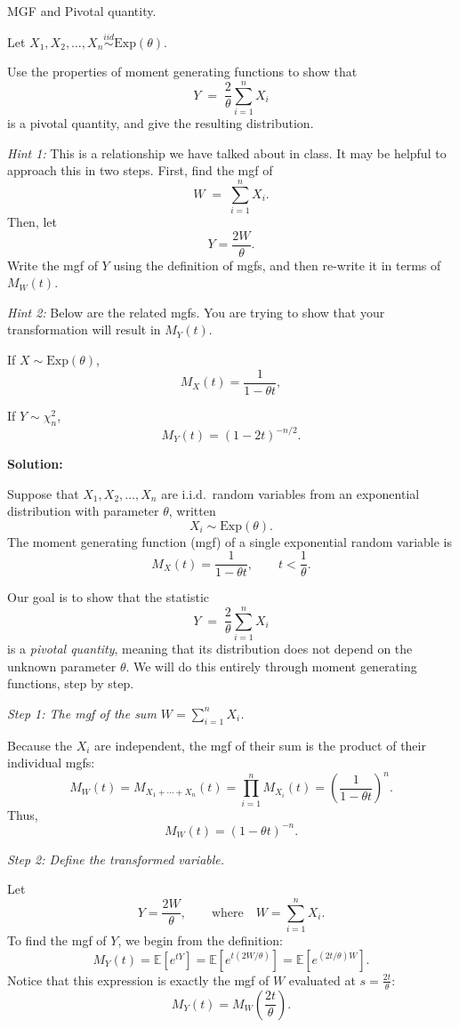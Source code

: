 \documentclass[11pt,letterpaper]{article}
\theoremstyle{remark}
\begin{document}
MGF and Pivotal quantity.

Let $X_1, X_2, \ldots, X_n \overset{iid}{\sim} \mathrm{Exp}(\theta)$.

Use the properties of moment generating functions to show that
\[
Y \;=\; \frac{2}{\theta}\sum_{i=1}^n X_i
\]
is a pivotal quantity, and give the resulting distribution.

\textit{Hint 1:} This is a relationship we have talked about in class. It may be helpful to approach this in two steps. First, find the mgf of
\[
W \;=\; \sum_{i=1}^n X_i.
\]
Then, let
\[
Y = \frac{2W}{\theta}.
\]
Write the mgf of $Y$ using the definition of mgfs, and then re-write it in terms of $M_W(t)$.

\textit{Hint 2:} Below are the related mgfs. You are trying to show that your transformation will result in $M_Y(t)$.

If $X \sim \mathrm{Exp}(\theta)$,
\[
M_X(t) = \frac{1}{1 - \theta t},
\]

If $Y \sim \chi^2_n$,
\[
M_Y(t) = (1 - 2t)^{-n/2}.
\]

\vspace{1cm}

\textbf{Solution:}

Suppose that $X_1, X_2, \dots, X_n$ are i.i.d.\ random variables from an exponential
distribution with parameter $\theta$, written
\[
X_i \sim \mathrm{Exp}(\theta).
\]
The moment generating function (mgf) of a single exponential random variable is
\[
M_X(t) = \frac{1}{1 - \theta t}, \qquad t < \frac{1}{\theta}.
\]

Our goal is to show that the statistic
\[
Y \;=\; \frac{2}{\theta}\sum_{i=1}^n X_i
\]
is a \emph{pivotal quantity}, meaning that its distribution does not depend on the
unknown parameter $\theta$. We will do this entirely through moment generating
functions, step by step.

\medskip
\textit{Step 1: The mgf of the sum $W = \sum_{i=1}^n X_i$.}

Because the $X_i$ are independent, the mgf of their sum is the product of their
individual mgfs:
\[
M_W(t)
= M_{X_1 + \cdots + X_n}(t)
= \prod_{i=1}^n M_{X_i}(t)
= \left( \frac{1}{1 - \theta t} \right)^n.
\]
Thus,
\[
M_W(t) = (1 - \theta t)^{-n}.
\]

\medskip
\textit{Step 2: Define the transformed variable.}

Let
\[
Y = \frac{2W}{\theta},
\qquad \text{where} \quad W = \sum_{i=1}^n X_i.
\]
To find the mgf of $Y$, we begin from the definition:
\[
M_Y(t)
= \mathbb{E}\!\left[e^{tY}\right]
= \mathbb{E}\!\left[e^{t(2W/\theta)}\right]
= \mathbb{E}\!\left[e^{(2t/\theta) W}\right].
\]
Notice that this expression is exactly the mgf of $W$ evaluated at
$s = \frac{2t}{\theta}$:
\[
M_Y(t)
= M_W\!\left(\frac{2t}{\theta}\right).
\]
\end{document}
